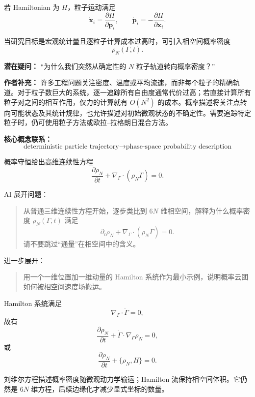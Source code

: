 \documentclass[11pt,openany]{ctexbook}
\begin{document}
若 Hamiltonian 为 \(H\)，粒子运动满足
\[
\dot{\bm x}_i=\frac{\partial H}{\partial \bm p_i},
\qquad
\dot{\bm p}_i=-\frac{\partial H}{\partial \bm x_i}.
\]

当研究目标是宏观统计量且逐粒子计算成本过高时，可引入相空间概率密度
\[
\rho_N(\Gamma,t).
\]

\begin{authornote}
\textbf{潜在疑问：}
“为什么我们突然从确定性的 \(N\) 粒子轨道转向概率密度？”

\textbf{作者补充：}
许多工程问题关注密度、温度或平均流速，而非每个粒子的精确轨道。对于粒子数巨大的系统，逐一追踪所有自由度通常代价过高；若直接计算所有粒子对之间的相互作用，仅力的计算就有 $O(N^2)$ 的成本。概率描述将关注点转向可能状态及其统计规律，也允许描述对初始微观状态的不确定性。需要追踪特定粒子时，仍可使用粒子方法或欧拉--拉格朗日混合方法。

\textbf{核心概念联系：}
\[
\text{deterministic particle trajectory}
\longrightarrow
\text{phase-space probability description}
\]
\end{authornote}

概率守恒给出高维连续性方程
\[
\frac{\partial \rho_N}{\partial t}
+
\nabla_\Gamma\cdot(\rho_N\dot\Gamma)=0.
\]

\begin{askai}
AI 展开问题：
\begin{quote}
从普通三维连续性方程开始，逐步类比到 \(6N\) 维相空间，解释为什么概率密度 \(\rho_N(\Gamma,t)\) 满足
\[
\partial_t\rho_N+\nabla_\Gamma\cdot(\rho_N\dot\Gamma)=0.
\]
请不要跳过“通量”在相空间中的含义。
\end{quote}

进一步展开：
\begin{quote}
用一个一维位置加一维动量的 Hamilton 系统作为最小示例，说明概率云团如何被相空间速度场搬运。
\end{quote}
\end{askai}

Hamilton 系统满足
\[
\nabla_\Gamma\cdot\dot\Gamma=0,
\]
故有
\[
\frac{\partial \rho_N}{\partial t}
+
\dot\Gamma\cdot\nabla_\Gamma\rho_N=0,
\]
或
\[
\frac{\partial \rho_N}{\partial t}+\{\rho_N,H\}=0.
\]

刘维尔方程描述概率密度随微观动力学输运；Hamilton 流保持相空间体积。它仍然是 \(6N\) 维方程，后续边缘化才减少显式坐标的数量。
\end{document}
